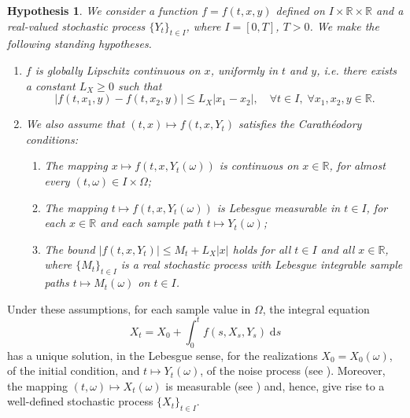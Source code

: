\documentclass[reqno,12pt]{amsart}
\theoremstyle{plain}%
\newtheorem{stdhyp}{Hypothesis}[section]
\theoremstyle{definition}
\begin{document}
\begin{stdhyp}
    \label{standinghypotheses1}
    We consider a function $f=f(t, x, y)$ defined on $I\times \mathbb{R}\times\mathbb{R}$ and a real-valued stochastic process $\{Y_t\}_{t\in I}$, where $I=[0, T]$, $T > 0$. We make the following standing hypotheses.
    \begin{enumerate}
        \item \label{standinghypotheses1Lx} $f$ is globally Lipschitz continuous on $x$, uniformly in $t$ and $y$, i.e. there exists a constant $L_X \geq 0$ such that
            \begin{equation}
                \label{Lxassumptionbasic}
                |f(t, x_1, y) - f(t, x_2, y)| \leq L_X |x_1 - x_2|, \quad \forall t \in I, \;\forall x_1, x_2, y\in\mathbb{R}.
            \end{equation}

        \item \label{standinghypotheses1Car} We also assume that $(t, x) \mapsto f(t, x, Y_t)$ satisfies the Carath\'eodory conditions:
            \begin{enumerate}
                \item The mapping $x \mapsto f(t, x, Y_t(\omega))$ is continuous on $x\in \mathbb{R}$, for almost every $(t, \omega)\in I\times \Omega$;
                \item The mapping $t \mapsto f(t, x, Y_t(\omega))$ is Lebesgue measurable in $t\in I$, for each $x\in \mathbb{R}$ and each sample path $t \mapsto Y_t(\omega)$;
                \item \label{standinghypotheses1Carboundonf} The bound $|f(t, x, Y_t)| \leq M_t + L_X|x|$ holds for all $t\in I$ and all $x\in\mathbb{R}$, where $\{M_t\}_{t\in I}$ is a real stochastic process with Lebesgue integrable sample paths $t\mapsto M_t(\omega)$ on $t\in I$.
            \end{enumerate}
    \end{enumerate}
\end{stdhyp}

Under these assumptions, for each sample value in $\Omega$, the integral equation
\begin{equation}
    \label{integralrodeform}
    X_t = X_0 + \int_0^t f(s, X_s, Y_s) \;\mathrm{d}s
\end{equation}
has a unique solution, in the Lebesgue sense, for the realizations $X_0 = X_0(\omega)$, of the initial condition, and $t\mapsto Y_t(\omega)$, of the noise process (see \cite[Theorem 1.1]{CoddingtonLevinson1985}). Moreover, the mapping $(t, \omega) \mapsto X_t(\omega)$ is measurable (see \cite[Section 2.1.2]{HanKloeden2017}) and, hence, give rise to a well-defined stochastic process $\{X_t\}_{t\in I}$.
\end{document}

